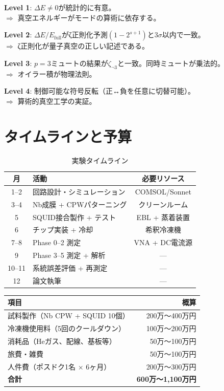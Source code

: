 \documentclass[12pt,a4paper]{article}
\begin{document}
\begin{specbox}[4段階の成功基準]
\textbf{Level 1}: $\Delta E \neq 0$が統計的に有意。\\
$\Rightarrow$ 真空エネルギーがモードの算術に依存する。

\textbf{Level 2}: $\Delta E / E_{\mathrm{full}}$がζ正則化予測$(1-2^{s+1})$と$3\sigma$以内で一致。\\
$\Rightarrow$ ζ正則化が量子真空の正しい記述である。

\textbf{Level 3}: $p=3$ミュートの結果が$\zeta_{\neg 3}$と一致。同時ミュートが乗法的。\\
$\Rightarrow$ オイラー積が物理法則。

\textbf{Level 4}: 制御可能な符号反転（正↔負を任意に切替可能）。\\
$\Rightarrow$ 算術的真空工学の実証。
\end{specbox}

\section{タイムラインと予算}

\begin{table}[h]
\centering
\caption{実験タイムライン}
\begin{tabular}{@{}clc@{}}
\toprule
月 & 活動 & 必要リソース \\
\midrule
1--2 & 回路設計・シミュレーション & COMSOL/Sonnet \\
3--4 & Nb成膜 + CPWパターニング & クリーンルーム \\
5 & SQUID接合製作 + テスト & EBL + 蒸着装置 \\
6 & チップ実装 + 冷却 & 希釈冷凍機 \\
7--8 & Phase 0--2 測定 & VNA + DC電流源 \\
9 & Phase 3--5 測定 + 解析 & --- \\
10--11 & 系統誤差評価 + 再測定 & --- \\
12 & 論文執筆 & --- \\
\bottomrule
\end{tabular}
\end{table}

\begin{specbox}
\begin{tabular}{lr}
\toprule
項目 & 概算 \\
\midrule
試料製作（Nb CPW + SQUID 10個）& 200万〜400万円 \\
冷凍機使用料（5回のクールダウン）& 100万〜200万円 \\
消耗品（Heガス、配線、基板等）& 50万〜100万円 \\
旅費・雑費 & 50万〜100万円 \\
人件費（ポスドク1名 × 6ヶ月） & 200万〜300万円 \\
\midrule
\textbf{合計} & \textbf{600万〜1,100万円} \\
\bottomrule
\end{tabular}
\end{specbox}
\end{document}
